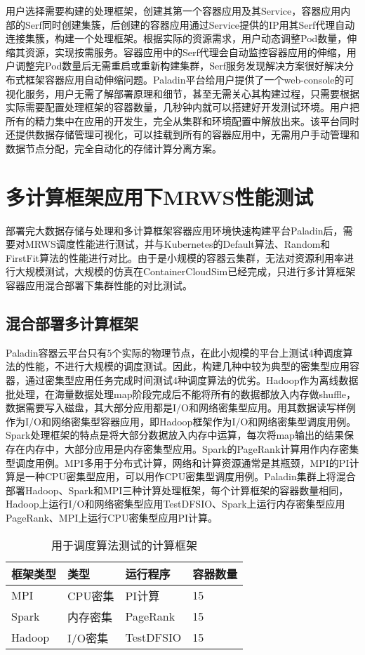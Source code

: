用户选择需要构建的处理框架，创建其第一个容器应用及其Service，容器应用内部的Serf同时创建集簇，后创建的容器应用通过Service提供的IP用其Serf代理自动连接集簇，构建一个处理框架。根据实际的资源需求，用户动态调整Pod数量，伸缩其资源，实现按需服务。容器应用中的Serf代理会自动监控容器应用的伸缩，用户调整完Pod数量后无需重启或重新构建集群，Serf服务发现解决方案很好解决分布式框架容器应用自动伸缩问题。Paladin平台给用户提供了一个web-console的可视化服务，用户无需了解部署原理和细节，甚至无需关心其构建过程，只需要根据实际需要配置处理框架的容器数量，几秒钟内就可以搭建好开发测试环境。用户把所有的精力集中在应用的开发生，完全从集群和环境配置中解放出来。该平台同时还提供数据存储管理可视化，可以挂载到所有的容器应用中，无需用户手动管理和数据节点分配，完全自动化的存储计算分离方案。

\section{多计算框架应用下MRWS性能测试}
部署完大数据存储与处理和多计算框架容器应用环境快速构建平台Paladin后，需要对MRWS调度性能进行测试，并与Kubernetes的Default算法、Random和FirstFit算法的性能进行对比。由于是小规模的容器云集群，无法对资源利用率进行大规模测试，大规模的仿真在ContainerCloudSim已经完成，只进行多计算框架容器应用混合部署下集群性能的对比测试。

\subsection{混合部署多计算框架}
Paladin容器云平台只有5个实际的物理节点，在此小规模的平台上测试4种调度算法的性能，不进行大规模的调度测试。因此，构建几种中较为典型的密集型应用容器，通过密集型应用任务完成时间测试4种调度算法的优劣。Hadoop作为离线数据批处理，在海量数据处理map阶段完成后不能将所有的数据都放入内存做shuffle，数据需要写入磁盘，其大部分应用都是I/O和网络密集型应用。用其数据读写样例作为I/O和网络密集型容器应用，即Hadoop框架作为I/O和网络密集型调度用例。Spark处理框架的特点是将大部分数据放入内存中运算，每次将map输出的结果保存在内存中，大部分应用是内存密集型应用。Spark的PageRank计算用作内存密集型调度用例。MPI多用于分布式计算，网络和计算资源通常是其瓶颈，MPI的PI计算是一种CPU密集型应用，可以用作CPU密集型调度用例。Paladin集群上将混合部署Hadoop、Spark和MPI三种计算处理框架，每个计算框架的容器数量相同，Hadoop上运行I/O和网络密集型应用TestDFSIO、Spark上运行内存密集型应用PageRank、MPI上运行CPU密集型应用PI计算。
\begin{table}[H]
	\centering\dawu[1.3]
	\caption{用于调度算法测试的计算框架}
	\begin{tabular}{|p{2.5cm}<{\centering}|p{2.5cm}<{\centering}|p{2.5cm}<{\centering}|p{2.5cm}<{\centering}|} \hline
		框架类型 & 类型 & 运行程序 & 容器数量 \\ \hline
		MPI & CPU密集 & PI计算 & 15 \\ \hline
		Spark & 内存密集 & PageRank & 15  \\ \hline
		Hadoop & I/O密集 & TestDFSIO & 15  \\ \hline
	\end{tabular}
\end{table}

